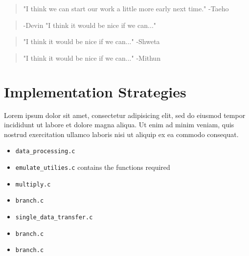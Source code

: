 \documentclass[11pt]{article}
\begin{document}
\begin{quote}
  "I think we can start our work a little more early next time." -Taeho
\end{quote}
\begin{quote}
  -Devin "I think it would be nice if we can..."
\end{quote}
\begin{quote}
  "I think it would be nice if we can..." -Shweta
\end{quote}
\begin{quote}
  "I think it would be nice if we can..." -Mithun
\end{quote}

\section{Implementation Strategies}

Lorem ipsum dolor sit amet, consectetur adipisicing elit, sed do eiusmod tempor
incididunt ut labore et dolore magna aliqua. Ut enim ad minim veniam, quis
nostrud exercitation ullamco laboris nisi ut aliquip ex ea commodo consequat.

\begin{itemize}
    \item \texttt{data\_processing.c}
    \item \texttt{emulate\_utilies.c} contains the functions required 
    \item \texttt{multiply.c}
    \item \texttt{branch.c}
    \item \texttt{single_data_transfer.c}
    \item \texttt{branch.c}
    \item \texttt{branch.c}
\end{itemize}
\end{document}
